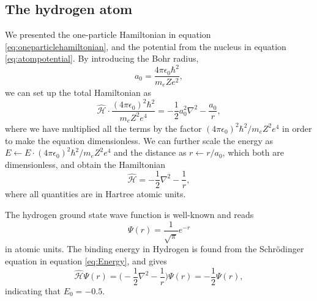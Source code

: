 \subsection{The hydrogen atom} \label{sec:hydrogen}
We presented the one-particle Hamiltonian in equation \eqref{eq:oneparticlehamiltonian}, and the potential from the nucleus in equation \eqref{eq:atompotential}. By introducing the Bohr radius,
\begin{equation}
a_0=\frac{4\pi\epsilon_0\hbar^2}{m_eZe^2},
\end{equation}
we can set up the total Hamiltonian as
\begin{equation}
\hat{\mathcal{H}}\cdot\frac{(4\pi\epsilon_0)^2\hbar^2}{m_eZ^2e^4}=-\frac{1}{2}a_0^2\nabla^2-\frac{a_0}{r},
\end{equation}
where we have multiplied all the terms by the factor $(4\pi\epsilon_0)^2\hbar^2/m_eZ^2e^4$ in order to make the equation dimensionless. We can further scale the energy as $E\leftarrow E\cdot (4\pi\epsilon_0)^2\hbar^2/m_eZ^2e^4$ and the distance as $r\leftarrow r/a_0$, which both are dimensionless, and obtain the Hamiltonian
\begin{equation}
\hat{\mathcal{H}}=-\frac{1}{2}\nabla^2-\frac{1}{r},
\end{equation}
where all quantities are in Hartree atomic units.

The hydrogen ground state wave function is well-known and reads
\begin{equation}
\Psi(r)=\frac{1}{\sqrt{\pi}}e^{-r}
\end{equation}
in atomic units. The binding energy in Hydrogen is found from the Schrödinger equation in equation \eqref{eq:Energy}, and gives
\begin{equation}
\hat{\mathcal{H}}\Psi(r)=\bigg(-\frac{1}{2}\nabla^2-\frac{1}{r}\bigg)\Psi(r)=-\frac{1}{2}\Psi(r),
\end{equation}
indicating that $E_0=-0.5$.

\iffalse
